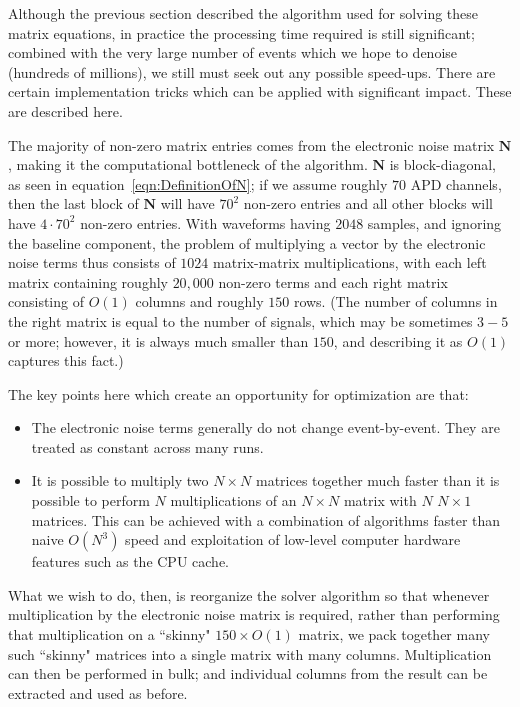 Although the previous section described the algorithm used for solving these matrix equations, in practice the processing time required is still significant; combined with the very large number of events which we hope to denoise (hundreds of millions), we still must seek out any possible speed-ups.  There are certain implementation tricks which can be applied with significant impact.  These are described here.

The majority of non-zero matrix entries comes from the electronic noise matrix $\mathbf{N}$, making it the computational bottleneck of the algorithm.  $\mathbf{N}$ is block-diagonal, as seen in equation~\ref{eqn:DefinitionOfN}; if we assume roughly $70$ APD channels, then the last block of $\mathbf{N}$ will have $70^2$ non-zero entries and all other blocks will have $4\cdot 70^2$ non-zero entries.  With waveforms having $2048$ samples, and ignoring the baseline component, the problem of multiplying a vector by the electronic noise terms thus consists of $1024$ matrix-matrix multiplications, with each left matrix containing roughly $20,000$ non-zero terms and each right matrix consisting of $O(1)$ columns and roughly $150$ rows.  (The number of columns in the right matrix is equal to the number of signals, which may be sometimes $3-5$ or more; however, it is always much smaller than $150$, and describing it as $O(1)$ captures this fact.)

The key points here which create an opportunity for optimization are that:
\begin{itemize}
\item The electronic noise terms generally do not change event-by-event.  They are treated as constant across many runs.
\item It is possible to multiply two $N \times N$ matrices together much faster than it is possible to perform $N$ multiplications of an $N \times N$ matrix with $N$ $N \times 1$ matrices.  This can be achieved with a combination of algorithms faster than naive $O(N^3)$ speed and exploitation of low-level computer hardware features such as the CPU cache.~\cite{BLASFirstReference}~\cite{AnatomyOfMatrixMultiply}
\end{itemize}
What we wish to do, then, is reorganize the solver algorithm so that whenever multiplication by the electronic noise matrix is required, rather than performing that multiplication on a ``skinny" $150 \times O(1)$ matrix, we pack together many such ``skinny" matrices into a single matrix with many columns.  Multiplication can then be performed in bulk; and individual columns from the result can be extracted and used as before.

